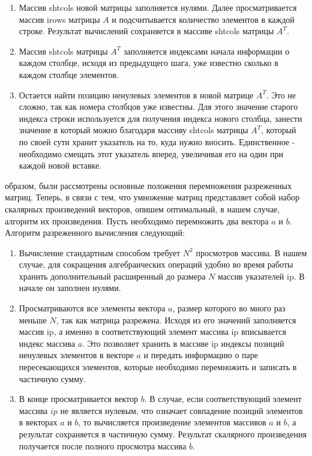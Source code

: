 \documentclass[12pt]{report}
\begin{document}
\begin{enumerate}
    \item Массив shtcols новой матрицы заполняется нулями. Далее просматривается массив irows матрицы $A$ и подсчитывается количество элементов в каждой строке. Результат вычислений сохраняется в массиве shtcols матрицы $A^T$.
    \item Массив shtcols матрицы $A^T$ заполняется индексами начала информации о каждом столбце, исходя из предыдущего шага, уже известно сколько в каждом столбце элементов.
    \item Остается найти позицию ненулевых элементов в новой матрице $A^T$. Это не сложно, так как номера столбцов уже известны. Для этого значение старого индекса строки используется для получения индекса нового столбца, занести значение в который можно благодаря массиву shtcols матрицы $A^T$, который по своей сути хранит указатель на то, куда нужно вносить. Единственное - необходимо смещать этот указатель вперед, увеличивая его на один при каждой новой вставке.
\end{enumerate}

 образом, были рассмотрены основные положения перемножения разреженных матриц. Теперь, в связи с тем, что умножение матриц представляет собой набор скалярных произведений векторов, опишем оптимальный, в нашем случае, алгоритм их произведения. Пусть необходимо перемножить два вектора $a$ и $b$. Алгоритм разреженного вычисления следующий:

\begin{enumerate}
    \item Вычисление стандартным способом требует $N^2$ просмотров массива. В нашем случае, для сокращения алгебраических операций удобно во время работы хранить дополнительный расширенный до размера $N$ массив указателей ip. В начале он заполнен нулями.
    \item Просматриваются все элементы вектора $a$, размер которого во много раз меньше $N$, так как матрица разрежена. Исходя из его значений заполняется массив ip, а именно в соответствующий элемент массива ip вписывается индекс массива $a$. Это позволяет хранить в массиве ip индексы позиций ненулевых элементов в векторе $a$ и передать информацию о паре пересекающихся элементов, которые необходимо перемножить и записать в частичную сумму.
    \item В конце просматривается вектор $b$. В случае, если соответствующий элемент массива $ip$ не является нулевым, что означает совпадение позиций элементов в векторах $a$ и $b$, то вычисляется произведение элементов массивов $a$ и $b$, а результат сохраняется в частичную сумму. Результат скалярного произведения получается после полного просмотра массива $b$.
\end{enumerate}
\end{document}
